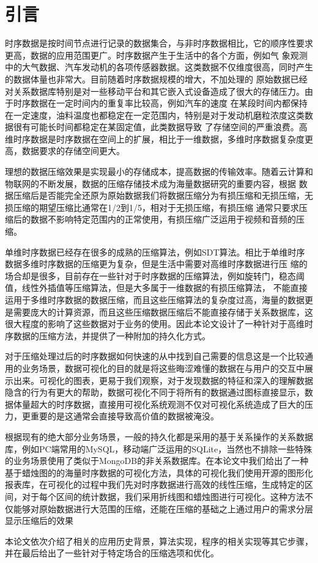 
\chapter{引言}
\label{Chapter 1}

时序数据是按时间节点进行记录的数据集合，与非时序数据相比，它的顺序性要求更高，数据的应用范围更广。时序数据产生于生活中的各个方面，例如气
象观测中的大气数据、汽车发动机的各项传感器数据。这类数据不仅维度很高，同时产生的数据体量也非常大。目前随着时序数据规模的增大，不加处理的
原始数据已经对关系数据库特别是对一些移动平台和其它嵌入式设备造成了很大的存储压力。由于时序数据在一定时间内的重复率比较高，例如汽车的速度
在某段时间内都保持在一定速度，油料温度也都稳定在一定范围内，特别是对于发动机磨粒浓度这类数据很有可能长时间都稳定在某固定值，此类数据导致
了存储空间的严重浪费。高维时序数据是时序数据在空间上的扩展，相比于一维数据，多维时序数据复杂度更高，数据要求的存储空间更大。

理想的数据压缩效果是实现最小的存储成本，提高数据的传输效率。随着云计算和物联网的不断发展，数据的压缩存储技术成为海量数据研究的重要内容，根据
数据压缩后是否能完全还原为原始数据我们将数据压缩分为有损压缩和无损压缩，无损压缩的期望压缩比通常在1/2到1/5，相对于无损压缩，有损压缩
通常只要求压缩后的数据不影响特定范围内的正常使用，有损压缩广泛运用于视频和音频的压缩。

单维时序数据已经存在很多的成熟的压缩算法，例如SDT算法。相比于单维时序数据多维时序数据的压缩更为复杂，但是生活中需要对高维时序数据进行压
缩的场合却是很多，目前存在一些针对于时序数据的压缩算法，例如旋转门，稳态阈值，线性外插值等压缩算法，但是大多属于一维数据的有损压缩算法，
不能直接运用于多维时序数据的数据压缩，而且这些压缩算法的复杂度过高，海量的数据更是需要庞大的计算资源，而且这些压缩数据压缩后不能直接存储于关系数据库，这很大程度的影响了这些数据对于业务的使用。因此本论文设计了一种针对于高维时序数据的压缩方法，并提供了一种附加的持久化方式。

对于压缩处理过后的时序数据如何快速的从中找到自己需要的信息这是一个比较通用的业务场景，数据可视化的目的就是将这些晦涩难懂的数据在与用户的交互中展示出来。可视化的图表，更易于我们观察，对于发现数据的特征和深入的理解数据隐含的行为有更大的帮助，数据可视化不同于将所有的数据通过图标直接显示，数据体量超大的时序数据，直接用可视化系统观测不仅对可视化系统造成了巨大的压力，更重要的是这通常会直接导致高价值的数据被淹没。

根据现有的绝大部分业务场景，一般的持久化都是采用的基于关系操作的关系数据库，例如PC端常用的MySQL，移动端广泛运用的SQLite，当然也不排除一些特殊的业务场景使用了类似于MongoDB的非关系数据库。在本论文中我们给出了一种基于蜡烛图的的海量时序数据的可视化方法，具体的可视化我们使用开源的图形化报表库，在可视化的过程中我们先对时序数据进行高效的线性压缩，生成特定的区间，对于每个区间的统计数据，我们采用折线图和蜡烛图进行可视化。这种方法不仅能够对原始数据进行大范围的压缩，还能在压缩的基础之上通过用户的需求分层显示压缩后的效果

本论文依次介绍了相关的应用历史背景，算法实现，程序的相关实现等其它步骤，并在最后给出了一些针对于特定场合的压缩选项和优化。







